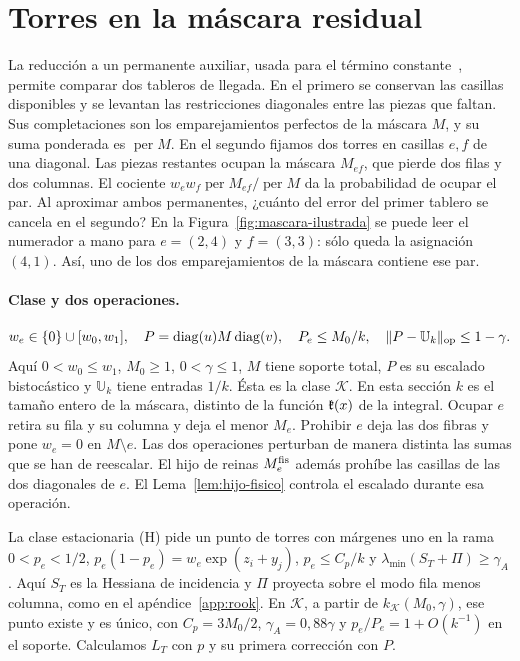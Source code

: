 \section{Torres en la máscara residual}\label{sec:torres}
\label{sec:rook}
La reducción a un permanente auxiliar, usada para el término constante~\cite{tc}, permite comparar
dos tableros de llegada. En el primero se conservan las casillas disponibles y se levantan las
restricciones diagonales entre las piezas que faltan. Sus completaciones son los emparejamientos
perfectos de la máscara $M$, y su suma ponderada es $\operatorname{per}M$. En el segundo fijamos
dos torres en casillas $e,f$ de una diagonal. Las piezas restantes ocupan la máscara $M_{ef}$,
que pierde dos filas y dos columnas. El cociente $w_ew_f\operatorname{per}M_{ef}/\operatorname{per}M$
da la probabilidad de ocupar el par. Al aproximar ambos permanentes, ¿cuánto del error del primer
tablero se cancela en el segundo? En la Figura~\ref{fig:mascara-ilustrada} se puede leer el
numerador a mano para $e=(2,4)$ y $f=(3,3)$: sólo queda la asignación $(4,1)$. Así, uno de los
dos emparejamientos de la máscara contiene ese par.

\paragraph{Clase y dos operaciones.}
\[
  w_e\in\{0\}\cup[w_0,w_1],\quad P=\operatorname{diag}(u)M\operatorname{diag}(v),
  \quad P_e\le M_0/k,\quad \|P-\mathbb U_k\|_{\rm op}\le1-\gamma .
\]
Aquí $0<w_0\le w_1$, $M_0\ge1$, $0<\gamma\le1$, $M$ tiene soporte total, $P$ es su escalado
bistocástico y $\mathbb U_k$ tiene entradas $1/k$. Ésta es la clase $\mathcal K$. En esta sección $k$ es
el tamaño entero de la máscara, distinto de la función $\mathfrak{k}(x)$ de la integral. Ocupar $e$ retira
su fila y su columna y deja el menor $M_e$. Prohibir $e$ deja las dos fibras y pone $w_e=0$ en
$M\setminus e$. Las dos operaciones perturban de manera distinta las sumas que se han de reescalar.
El hijo de reinas $M_e^{\rm fis}$ además prohíbe las casillas de las dos diagonales de $e$.
El Lema~\ref{lem:hijo-fisico} controla el escalado durante esa operación.

La clase estacionaria (H) pide un punto de torres con márgenes uno en la rama $0<p_e<1/2$,
$p_e(1-p_e)=w_e\exp(z_i+y_j)$, $p_e\le C_p/k$ y $\lambda_{\min}(S_T+\Pi)\ge\gamma_A$.
Aquí $S_T$ es la Hessiana de incidencia y $\Pi$ proyecta sobre el modo fila menos columna,
como en el apéndice~\ref{app:rook}. En $\mathcal K$, a partir de $k_{\mathcal K}(M_0,\gamma)$,
ese punto existe y es único, con $C_p=3M_0/2$, $\gamma_A=0{,}88\gamma$ y $p_e/P_e=1+O(k^{-1})$
en el soporte. Calculamos $L_T$ con $p$ y su primera corrección con $P$.

